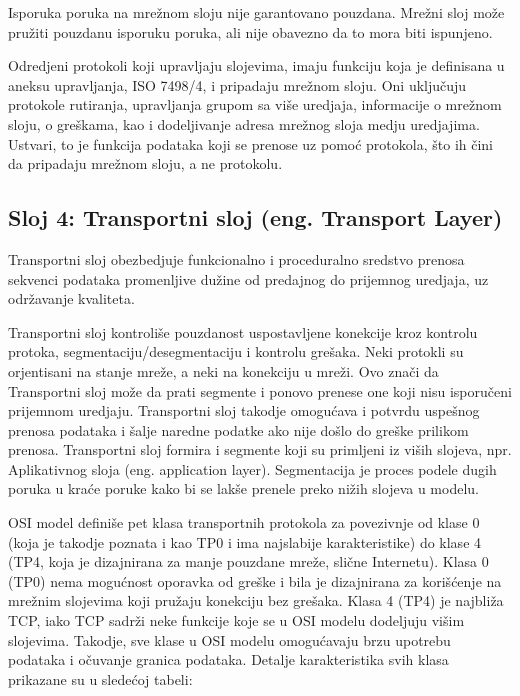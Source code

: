 \documentclass[a4paper,12pt, master]{etf}
\begin{document}
	Isporuka poruka na mre\v{z}nom sloju nije garantovano pouzdana. Mre\v{z}ni
	sloj mo\v{z}e pru\v{z}iti pouzdanu isporuku poruka, ali nije obavezno da to
	mora biti ispunjeno.

	Odredjeni protokoli koji upravljaju slojevima, imaju funkciju koja je
	definisana u aneksu	upravljanja, ISO 7498/4, i pripadaju mre\v{z}nom sloju.
	Oni uklju\v{c}uju protokole rutiranja, upravljanja grupom sa vi\v{s}e
	uredjaja, informacije o mre\v{z}nom sloju, o gre\v{s}kama, kao i
	dodeljivanje adresa mre\v{z}nog sloja medju uredjajima. Ustvari, to je
	funkcija podataka koji se prenose uz pomo\'{c} protokola, \v{s}to ih
	\v{c}ini da pripadaju mre\v{z}nom sloju, a ne protokolu.

	\subsection{Sloj 4: Transportni sloj (eng\@. Transport Layer)}

	Transportni sloj obezbedjuje funkcionalno i proceduralno sredstvo prenosa
	sekvenci podataka promenljive du\v{z}ine od predajnog do prijemnog uredjaja,
	 uz odr\v{z}avanje kvaliteta.

	Transportni sloj kontroli\v{s}e pouzdanost uspostavljene konekcije kroz
	kontrolu protoka, segmentaciju/desegmentaciju i kontrolu gre\v{s}aka. Neki
	protokli su orjentisani na stanje mre\v{z}e, a neki na konekciju u
	mre\v{z}i. Ovo zna\v{c}i da Transportni sloj mo\v{z}e da prati segmente i
	ponovo prenese one koji nisu isporu\v{c}eni prijemnom uredjaju. Transportni
	sloj takodje omogu\'{c}ava i potvrdu uspe\v{s}nog prenosa podataka i
	\v{s}alje naredne podatke ako nije do\v{s}lo do gre\v{s}ke prilikom prenosa.
    Transportni sloj formira i segmente koji su primljeni iz vi\v{s}ih slojeva,
    npr. Aplikativnog sloja (eng\@. application layer). Segmentacija je proces podele
    dugih poruka u kra\'{c}e poruke kako bi se lak\v{s}e prenele preko ni\v{z}ih
    slojeva u modelu.

	OSI model defini\v{s}e pet klasa transportnih protokola za povezivnje od
	klase 0 (koja je takodje poznata i kao TP0 i ima najslabije karakteristike)
	do klase 4 (TP4, koja je dizajnirana za manje pouzdane mre\v{z}e,
	sli\v{c}ne Internetu). Klasa 0 (TP0) nema mogu\'{c}nost	oporavka od
	gre\v{s}ke i bila je dizajnirana za kori\v{s}\'{c}enje na mre\v{z}nim
	slojevima koji pru\v{z}aju konekciju bez gre\v{s}aka. Klasa 4 (TP4) je
	najbli\v{z}a TCP, iako TCP sadr\v{z}i neke funkcije koje se u OSI modelu
	dodeljuju vi\v{s}im slojevima. Takodje, sve klase u OSI modelu
	omogu\'{c}avaju	brzu upotrebu podataka i o\v{c}uvanje granica podataka.
    Detalje karakteristika svih klasa prikazane su u slede\'{c}oj tabeli:
\end{document}
